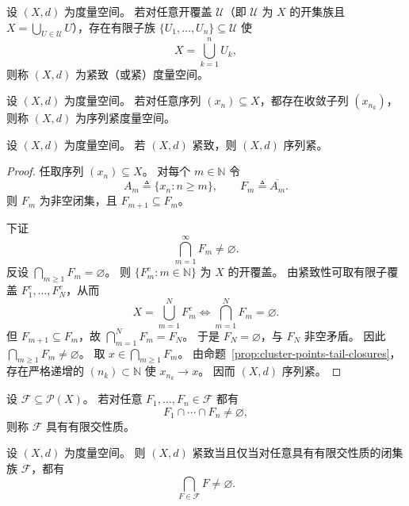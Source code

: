 \documentclass[lang=cn,a4paper,newtx,section]{elegantbook}
\begin{document}
\begin{definition}
  设 $(X,d)$ 为度量空间。
  若对任意开覆盖 $\mathcal{U}$（即 $\mathcal{U}$ 为 $X$ 的开集族且 $X=\bigcup_{U\in\mathcal{U}}U$），存在有限子族 $\{U_1,\dots,U_n\}\subseteq\mathcal{U}$ 使
  \[
    X=\bigcup_{k=1}^{n}U_k,
  \]
  则称 $(X,d)$ 为紧致（或紧）度量空间。
\end{definition}

\begin{definition}
  设 $(X,d)$ 为度量空间。
  若对任意序列 $(x_n)\subseteq X$，都存在收敛子列 $(x_{n_k})$，则称 $(X,d)$ 为序列紧度量空间。
\end{definition}

\begin{proposition}\label{prop:compact-implies-sequentially-compact}
  设 $(X,d)$ 为度量空间。
  若 $(X,d)$ 紧致，则 $(X,d)$ 序列紧。
\end{proposition}

\begin{proof}
  任取序列 $(x_n)\subseteq X$。
  对每个 $m\in\mathbb{N}$ 令
  \[
    A_m\triangleq\{x_n:n\ge m\},\qquad F_m\triangleq\overline{A_m}.
  \]
  则 $F_m$ 为非空闭集，且 $F_{m+1}\subseteq F_m$。

  下证
  \[
    \bigcap_{m=1}^{\infty}F_m\ne\varnothing.
  \]
  反设 $\bigcap_{m\ge1}F_m=\varnothing$。
  则 $\{F_m^c:m\in\mathbb{N}\}$ 为 $X$ 的开覆盖。
  由紧致性可取有限子覆盖 $F_1^c,\dots,F_N^c$，从而
  \[
    X=\bigcup_{m=1}^{N}F_m^c\iff \bigcap_{m=1}^{N}F_m=\varnothing.
  \]
  但 $F_{m+1}\subseteq F_m$，故 $\bigcap_{m=1}^{N}F_m=F_N$。
  于是 $F_N=\varnothing$，与 $F_N$ 非空矛盾。
  因此 $\bigcap_{m\ge1}F_m\ne\varnothing$。
  取 $x\in\bigcap_{m\ge1}F_m$。
  由命题~\ref{prop:cluster-points-tail-closures}，存在严格递增的 $(n_k)\subset\mathbb{N}$ 使 $x_{n_k}\to x$。
  因而 $(X,d)$ 序列紧。
\end{proof}

\begin{definition}
  设 $\mathcal{F}\subseteq\mathcal{P}(X)$。
  若对任意 $F_1,\dots,F_n\in\mathcal{F}$ 都有
  \[
    F_1\cap\cdots\cap F_n\ne\varnothing,
  \]
  则称 $\mathcal{F}$ 具有有限交性质。
\end{definition}

\begin{theorem}\label{thm:compact-fip}
  设 $(X,d)$ 为度量空间。
  则 $(X,d)$ 紧致当且仅当对任意具有有限交性质的闭集族 $\mathcal{F}$，都有
  \[
    \bigcap_{F\in\mathcal{F}}F\ne\varnothing.
  \]
\end{theorem}
\end{document}
